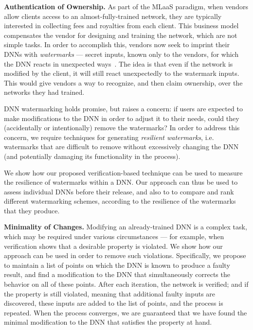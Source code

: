 \documentclass{easychair}
\begin{document}
\medskip\noindent
\textbf{Authentication of Ownership.}
As part of the MLaaS paradigm, when vendors allow clients access to an almost-fully-trained network,
they are typically interested in collecting fees and royalties from
each client. This business model compensates the vendor for designing
and training the network, which are not simple tasks. In order to
accomplish this, vendors now seek to imprint their DNNs with
\emph{watermarks} --- secret inputs, known only to the vendors, for which the DNN reacts in
unexpected ways~\cite{AdBaPiKeWatermarking}. The idea is that even if the network is modified by
the client, it will still react unexpectedly to the watermark inputs. This would give vendors a way to
recognize, and then claim ownership, over the networks they had
trained.

DNN watermarking holds promise, but raises a concern: if users are
expected to make modifications to the DNN in order to adjust it to
their needs, could they (accidentally or intentionally) remove the
watermarks? In order to address this concern, we require techniques
for generating \emph{resilient watermarks}, i.e. watermarks that are
difficult to remove without excessively changing the DNN (and
potentially damaging its functionality in the process).

We show how our proposed verification-based technique can be used to
measure the resilience of watermarks within a DNN. Our approach can
thus be used to assess individual DNNs before their release, and also to
to compare and rank different watermarking schemes, according to
the resilience of the watermarks that they produce.

\medskip\noindent \textbf{Minimality of Changes.}
Modifying an already-trained DNN is a complex task, which may be
required under various circumstances --- for example, when
verification shows that a desirable property is violated. 
We show how our approach can be used in order to remove such
violations. Specifically, we propose to maintain a list of points on which
the DNN is known to produce a faulty result, and find a modification
to the DNN that simultaneously corrects the behavior on all of these
points. After each iteration, the network is verified; and if
the property is still violated, meaning that additional faulty inputs
are discovered, these inputs are added to the list of
points, and the process is repeated. When the process converges, we
are guaranteed that we have found the minimal modification to the DNN
that satisfies the property at hand.
\end{document}
